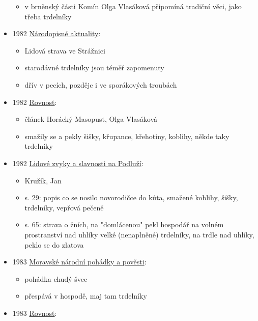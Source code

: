 \begin{itemize}
  \begin{itemize}
  \tightlist
  \item
    v brněnský části Komín Olga Vlasáková připomíná tradiční věci, jako
    třeba trdelníky
  \end{itemize}
\item
  1982
  \href{https://ceskadigitalniknihovna.cz/uuid/uuid:605643a0-4d40-11e5-a525-5ef3fc9ae867}{Národopisné
  aktuality}:

  \begin{itemize}
  \tightlist
  \item
    Lidová strava ve Strážnici
  \item
    starodávné trdelníky jsou téměř zapomenuty
  \item
    dřív v pecích, pozdějc i ve sporákových troubách
  \end{itemize}
\item
  1982
  \href{https://ceskadigitalniknihovna.cz/uuid/uuid:8e4f05a0-1a98-11f0-8eb6-5ef3fc9bb22f}{Rovnost}:

  \begin{itemize}
  \tightlist
  \item
    článek Horácký Masopust, Olga Vlasáková
  \item
    smažily se a pekly šišky, křupance, křehotiny, koblihy, někde taky
    trdelníky
  \end{itemize}
\item
  1982
  \href{https://ceskadigitalniknihovna.cz/uuid/uuid:55d93f60-3319-11e8-8cf8-005056827e52}{Lidové
  zvyky a slavnosti na Podluží}:

  \begin{itemize}
  \tightlist
  \item
    Kružík, Jan
  \item
    s. 29: popis co se nosilo novorodičce do kúta, smažené koblihy,
    šišky, trdelníky, vepřová pečeně
  \item
    s. 65: strava o žních, na "domlácenou" pekl hospodář na volném
    prostranství nad uhlíky velké (nenaplněné) trdelníky, na trdle nad
    uhlíky, peklo se do zlatova
  \end{itemize}
\item
  1983
  \href{https://ceskadigitalniknihovna.cz/uuid/uuid:630563b0-2c45-11e3-b62e-005056825209}{Moravské
  národní pohádky a pověsti}:

  \begin{itemize}
  \tightlist
  \item
    pohádka chudý švec
  \item
    přespává v hospodě, maj tam trdelníky
  \end{itemize}
\item
  1983
  \href{https://ndk.cz/uuid/uuid:2dc5f8a0-fd98-11ef-b1df-5ef3fc9bb22f}{Rovnost}:


\end{itemize}
